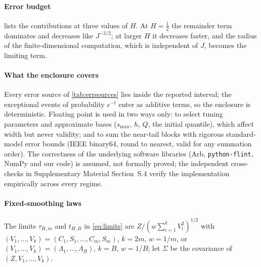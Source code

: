 \paragraph{Error budget}  lists the contributions at three values of $H$. At $H=\frac12$ the remainder
term dominates and decreases like $J^{-3/2}$; at larger $H$ it decreases faster, and the radius of the finite-dimensional
computation, which is independent of $J$, becomes the limiting term.

\begin{table}[tbp]\centering\small
\caption{Contributions to the certified probability error at the 90th percentile with $J=16384$.}\label{tab:budget}
%
\end{table}

\paragraph{What the enclosure covers} Every error source of \cref{tab:errsources} lies inside the reported interval; the
exceptional events of probability $e^{-t}$ enter as additive terms, so the enclosure is deterministic. Floating point
is used in two ways only: to select tuning parameters and approximate bases ($s_{\max}$, $h$, $Q$, the initial quantile),
which affect width but never validity; and to sum the near-tail blocks with rigorous standard-model error bounds (IEEE
binary64, round to nearest, valid for any summation order). The correctness of the underlying software libraries (Arb,
\texttt{python-flint}, NumPy and our code) is assumed, not formally proved; the independent cross-checks in
Supplementary Material Section~S.4 verify the implementation empirically across every regime.

\paragraph{Fixed-smoothing laws} The limits $\tau_{H,m}$ and $t_{H,B}$ in \eqref{eq:limits} are $Z/(w\sum_{i=1}^kV_i^2)^{1/2}$
with $(V_1,\dots,V_k)=(C_1,S_1,\dots,C_m,S_m)$, $k=2m$, $w=1/m$, or $(V_1,\dots,V_k)=(\Lambda_1,\dots,\Lambda_B)$, $k=B$, $w=1/B$;
let $\Sigma$ be the covariance of $(Z,V_1,\dots,V_k)$.

